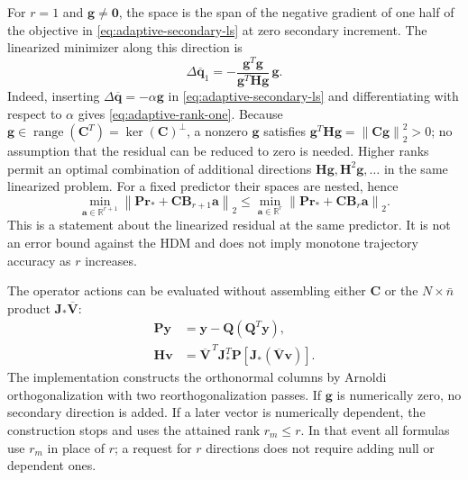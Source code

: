 \documentclass[11pt]{article}
\newcommand{\qbar}{\overline{\mathbf q}}
\newcommand{\norm}[1]{\left\lVert #1 \right\rVert}
\begin{document}
For $r=1$ and $\mathbf g\ne\mathbf0$, the space is the span of
the negative gradient of one half of the objective in
\eqref{eq:adaptive-secondary-ls} at zero secondary increment.  The
linearized minimizer along this direction is
\begin{equation}
\Delta\qbar_1=-\frac{\mathbf g^T\mathbf g}
{\mathbf g^T\mathbf H\mathbf g}\,\mathbf g.
\label{eq:adaptive-rank-one}
\end{equation}
Indeed, inserting $\Delta\qbar=-\alpha\mathbf g$ in
\eqref{eq:adaptive-secondary-ls} and differentiating with respect to
$\alpha$ gives \eqref{eq:adaptive-rank-one}.  Because
$\mathbf g\in\operatorname{range}(\mathbf C^T)=\ker(\mathbf C)^\perp$,
a nonzero $\mathbf g$ satisfies
$\mathbf g^T\mathbf H\mathbf g=\norm{\mathbf C\mathbf g}_2^2>0$;
no assumption that the residual can be reduced to zero is needed.
Higher ranks permit an optimal combination of additional directions
$\mathbf H\mathbf g,\mathbf H^2\mathbf g,\ldots$ in the same
linearized problem.  For a fixed predictor their spaces are nested, hence
\begin{equation}
\min_{\mathbf a\in\mathbb R^{r+1}}
\norm{\mathbf P\mathbf r_*+\mathbf C\mathbf B_{r+1}\mathbf a}_2
\leq
\min_{\mathbf a\in\mathbb R^r}
\norm{\mathbf P\mathbf r_*+\mathbf C\mathbf B_r\mathbf a}_2.
\label{eq:adaptive-nested-bound}
\end{equation}
This is a statement about the linearized residual at the same predictor.
It is not an error bound against the HDM and does not imply monotone
trajectory accuracy as $r$ increases.

The operator actions can be evaluated without assembling either
$\mathbf C$ or the $N\times\bar n$ product
$\mathbf J_*\overline{\mathbf V}$:
\begin{equation}
\begin{aligned}
\mathbf P\mathbf y&=\mathbf y-\mathbf Q(\mathbf Q^T\mathbf y),\\
\mathbf H\mathbf v&=\overline{\mathbf V}^{\,T}\mathbf J_*^T
\mathbf P\left[\mathbf J_*(\overline{\mathbf V}\mathbf v)\right].
\end{aligned}
\label{eq:adaptive-actions}
\end{equation}
The implementation constructs the orthonormal columns by Arnoldi
orthogonalization with two reorthogonalization passes.  If $\mathbf g$
is numerically zero, no secondary direction is added.  If a later vector
is numerically dependent, the construction stops and uses the attained
rank $r_m\leq r$.  In that event all formulas use $r_m$ in place of $r$;
a request for $r$ directions does not require adding null or dependent ones.
\end{document}
